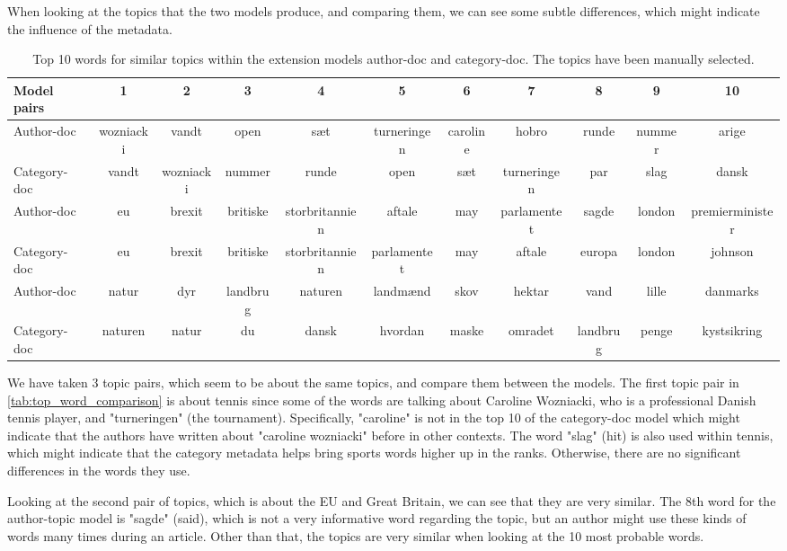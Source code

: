 When looking at the topics that the two models produce, and comparing them, we can see some subtle differences, which might indicate the influence of the metadata.
\begin{table}
		\centering
	\caption{Top 10 words for similar topics within the extension models author-doc and category-doc. The topics have been manually selected.}
	\begin{tabular}{l|c|c|c|c|c|c|c|c|c|c}
		Model pairs & 1 & 2 & 3 & 4 & 5 & 6 & 7 & 8 & 9 & 10 \\
		\midrule
		Author-doc & wozniacki & vandt & open & sæt & turneringen & caroline & hobro & runde & nummer & arige \\
		Category-doc & vandt & wozniacki & nummer & runde & open & sæt & turneringen & par & slag & dansk \\
		\midrule
		Author-doc & eu & brexit & britiske & storbritannien & aftale & may & parlamentet & sagde & london & premierminister \\
		Category-doc & eu & brexit & britiske & storbritannien & parlamentet & may & aftale & europa & london & johnson \\
		\midrule
		Author-doc & natur & dyr & landbrug & naturen & landmænd & skov & hektar & vand & lille & danmarks \\
		Category-doc & naturen & natur & du & dansk & hvordan & maske & omradet & landbrug & penge & kystsikring \\
	\end{tabular}
	\label{tab:top_word_comparison}
\end{table}
We have taken 3 topic pairs, which seem to be about the same topics, and compare them between the models.
The first topic pair in \autoref{tab:top_word_comparison} is about tennis since some of the words are talking about Caroline Wozniacki, who is a professional Danish tennis player, and "turneringen" (the tournament).
Specifically, "caroline" is not in the top 10 of the category-doc model which might indicate that the authors have written about "caroline wozniacki" before in other contexts.
The word "slag" (hit) is also used within tennis, which might indicate that the category metadata helps bring sports words higher up in the ranks.
Otherwise, there are no significant differences in the words they use.

Looking at the second pair of topics, which is about the EU and Great Britain, we can see that they are very similar.
The 8th word for the author-topic model is "sagde" (said), which is not a very informative word regarding the topic, but an author might use these kinds of words many times during an article.
Other than that, the topics are very similar when looking at the 10 most probable words.

